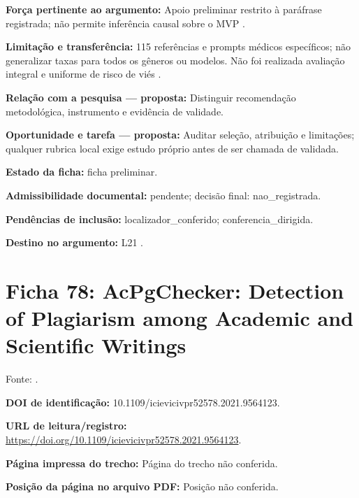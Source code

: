 \noindent\textbf{Força pertinente ao argumento:} Apoio preliminar restrito à paráfrase registrada; não permite inferência causal sobre o MVP \citep{SU07}.\par\medskip

\noindent\textbf{Limitação e transferência:} 115 referências e prompts médicos específicos; não generalizar taxas para todos os gêneros ou modelos. Não foi realizada avaliação integral e uniforme de risco de viés \citep{SU07}.\par\medskip

\noindent\textbf{Relação com a pesquisa — proposta:} Distinguir recomendação metodológica, instrumento e evidência de validade.\par\medskip

\noindent\textbf{Oportunidade e tarefa — proposta:} Auditar seleção, atribuição e limitações; qualquer rubrica local exige estudo próprio antes de ser chamada de validada.\par\medskip

\noindent\textbf{Estado da ficha:} ficha preliminar.\par\medskip

\noindent\textbf{Admissibilidade documental:} pendente; decisão final: nao\_registrada.\par\medskip

\noindent\textbf{Pendências de inclusão:} localizador\_conferido; conferencia\_dirigida.\par\medskip

\noindent\textbf{Destino no argumento:} L21 .

\clearpage\section*{Ficha 78: AcPgChecker: Detection of Plagiarism among Academic and Scientific Writings}

Fonte: \citet{SU08}.

\noindent\textbf{DOI de identificação:} 10.1109/icievicivpr52578.2021.9564123.\par\medskip

\noindent\textbf{URL de leitura/registro:} \url{https://doi.org/10.1109/icievicivpr52578.2021.9564123}.\par\medskip

\noindent\textbf{Página impressa do trecho:} Página do trecho não conferida.\par\medskip

\noindent\textbf{Posição da página no arquivo PDF:} Posição não conferida.\par\medskip

